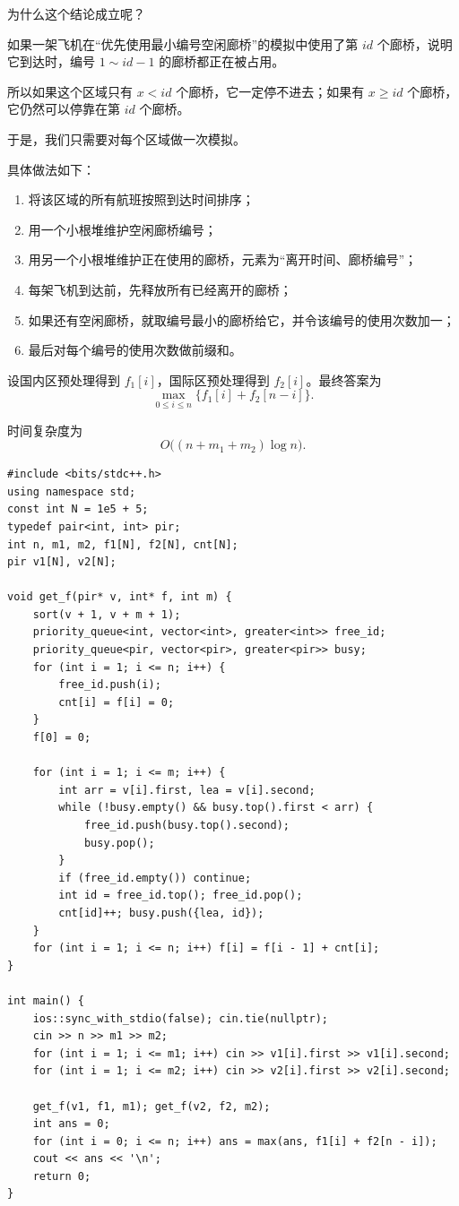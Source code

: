 \documentclass{book}
\begin{document}
为什么这个结论成立呢？

如果一架飞机在“优先使用最小编号空闲廊桥”的模拟中使用了第 $id$ 个廊桥，说明它到达时，编号 $1\sim id-1$ 的廊桥都正在被占用。

所以如果这个区域只有 $x<id$ 个廊桥，它一定停不进去；如果有 $x\ge id$ 个廊桥，它仍然可以停靠在第 $id$ 个廊桥。

于是，我们只需要对每个区域做一次模拟。

具体做法如下：

\begin{enumerate}[leftmargin=2em,itemsep=1pt,topsep=2pt,parsep=0pt,partopsep=0pt]
    \item 将该区域的所有航班按照到达时间排序；
    \item 用一个小根堆维护空闲廊桥编号；
    \item 用另一个小根堆维护正在使用的廊桥，元素为“离开时间、廊桥编号”；
    \item 每架飞机到达前，先释放所有已经离开的廊桥；
    \item 如果还有空闲廊桥，就取编号最小的廊桥给它，并令该编号的使用次数加一；
    \item 最后对每个编号的使用次数做前缀和。
\end{enumerate}

设国内区预处理得到 $f_1[i]$，国际区预处理得到 $f_2[i]$。最终答案为
\[
\max_{0\le i\le n}\{f_1[i]+f_2[n-i]\}.
\]

时间复杂度为
\[
O\bigl((n+m_1+m_2)\log n\bigr).
\]
\newpage

\begin{lstlisting}[style = code]
#include <bits/stdc++.h>
using namespace std;
const int N = 1e5 + 5;
typedef pair<int, int> pir;
int n, m1, m2, f1[N], f2[N], cnt[N];
pir v1[N], v2[N];

void get_f(pir* v, int* f, int m) {
    sort(v + 1, v + m + 1);
    priority_queue<int, vector<int>, greater<int>> free_id;
    priority_queue<pir, vector<pir>, greater<pir>> busy;
    for (int i = 1; i <= n; i++) {
        free_id.push(i);
        cnt[i] = f[i] = 0;
    }
    f[0] = 0;

    for (int i = 1; i <= m; i++) {
        int arr = v[i].first, lea = v[i].second;
        while (!busy.empty() && busy.top().first < arr) {
            free_id.push(busy.top().second);
            busy.pop();
        }
        if (free_id.empty()) continue;
        int id = free_id.top(); free_id.pop();
        cnt[id]++; busy.push({lea, id});
    }
    for (int i = 1; i <= n; i++) f[i] = f[i - 1] + cnt[i];
}

int main() {
    ios::sync_with_stdio(false); cin.tie(nullptr);
    cin >> n >> m1 >> m2;
    for (int i = 1; i <= m1; i++) cin >> v1[i].first >> v1[i].second;
    for (int i = 1; i <= m2; i++) cin >> v2[i].first >> v2[i].second;

    get_f(v1, f1, m1); get_f(v2, f2, m2);
    int ans = 0;
    for (int i = 0; i <= n; i++) ans = max(ans, f1[i] + f2[n - i]);
    cout << ans << '\n';
    return 0;
}
\end{lstlisting}
\newpage
\end{document}
